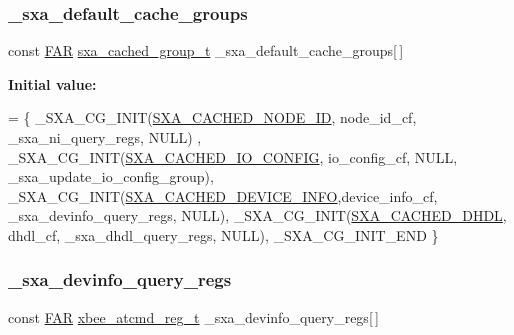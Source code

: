 \subsubsection{\texorpdfstring{\+\_\+sxa\+\_\+default\+\_\+cache\+\_\+groups}{\_sxa\_default\_cache\_groups}}
{\footnotesize\ttfamily const \hyperlink{group__hal_gaef060b3456fdcc093a7210a762d5f2ed}{F\+AR} \hyperlink{structsxa__cached__group__t}{sxa\+\_\+cached\+\_\+group\+\_\+t} \+\_\+sxa\+\_\+default\+\_\+cache\+\_\+groups\mbox{[}$\,$\mbox{]}}

{\bfseries Initial value\+:}
\begin{DoxyCode}
=
\{
   \_SXA\_CG\_INIT(\hyperlink{group___s_x_a_ggabed82baf7f470b522273a3e37c24c600a8d6b7f78660e6b7da06d0fa99dfb6df6}{SXA\_CACHED\_NODE\_ID},    node\_id\_cf,       \_sxa\_ni\_query\_regs,        NULL)
      ,
   \_SXA\_CG\_INIT(\hyperlink{group___s_x_a_ggabed82baf7f470b522273a3e37c24c600a8f3afd72952b8d47c03b1c9c4ea76622}{SXA\_CACHED\_IO\_CONFIG},   io\_config\_cf,     NULL,                      
      \_sxa\_update\_io\_config\_group),
   \_SXA\_CG\_INIT(\hyperlink{group___s_x_a_ggabed82baf7f470b522273a3e37c24c600a689a1dccc7c16583fec02c8d8c7ba35d}{SXA\_CACHED\_DEVICE\_INFO},device\_info\_cf,  \_sxa\_devinfo\_query\_regs,   
      NULL),
   \_SXA\_CG\_INIT(\hyperlink{group___s_x_a_ggabed82baf7f470b522273a3e37c24c600a0ad9240e8ef31156d92883213e899924}{SXA\_CACHED\_DHDL},       dhdl\_cf,          \_sxa\_dhdl\_query\_regs,      NULL),
   \_SXA\_CG\_INIT\_END
\}
\end{DoxyCode}
\mbox{\label{group___s_x_a_ga96cff97476dfc4ddb18bfd8b65731472}} 
\subsubsection{\texorpdfstring{\+\_\+sxa\+\_\+devinfo\+\_\+query\+\_\+regs}{\_sxa\_devinfo\_query\_regs}}
{\footnotesize\ttfamily const \hyperlink{group__hal_gaef060b3456fdcc093a7210a762d5f2ed}{F\+AR} \hyperlink{structxbee__atcmd__reg__t}{xbee\+\_\+atcmd\+\_\+reg\+\_\+t} \+\_\+sxa\+\_\+devinfo\+\_\+query\+\_\+regs\mbox{[}$\,$\mbox{]}}


